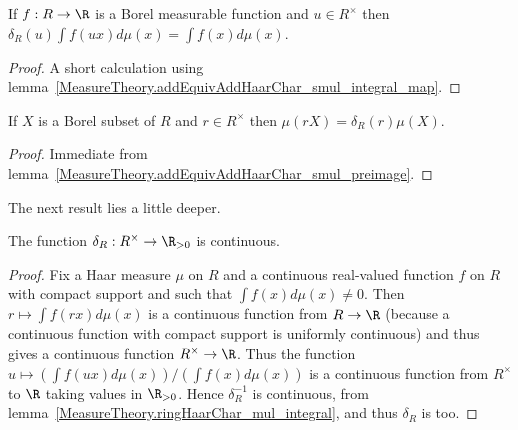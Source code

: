 \begin{lemma}
  \label{MeasureTheory.ringHaarChar_mul_integral}
  \leanok
  If $f:R\to\R$ is a Borel measurable function and $u\in R^\times$ then
  $\delta_R(u)\int f(ux)d\mu(x)=\int f(x)d\mu(x)$.
\end{lemma}
\begin{proof}
  \leanok
  A short calculation using lemma~\ref{MeasureTheory.addEquivAddHaarChar_smul_integral_map}.
\end{proof}

\begin{lemma}
  \label{MeasureTheory.ringHaarChar_mul_volume}
  \leanok
  If $X$ is a Borel subset of $R$ and $r\in R^\times$ then $\mu(rX)=\delta_R(r)\mu(X)$.
\end{lemma}
\begin{proof}
  \leanok
   Immediate from lemma~\ref{MeasureTheory.addEquivAddHaarChar_smul_preimage}.
\end{proof}

The next result lies a little deeper.

\begin{corollary}
  \label{MeasureTheory.ringHaarChar_continuous}
  \leanok
  The function $\delta_R:R^\times\to\R_{>0}$ is continuous.
\end{corollary}
\begin{proof}
  Fix a Haar measure $\mu$ on $R$ and a continuous real-valued function
  $f$ on $R$ with compact support and such that $\int f(x) d\mu(x)\not=0$.
  Then $r \mapsto \int f(rx) d\mu(x)$ is a continuous function
  from $R\to\R$ (because a continuous function with compact support is uniformly
   continuous) and thus gives a continuous function $R^\times\to\R$.
   Thus the function $u\mapsto (\int f(ux) d\mu(x))/(\int f(x)d\mu(x))$ is
   a continuous function from $R^\times$ to $\R$ taking values in $\R_{>0}$.
   Hence $\delta_R^{-1}$ is continuous,
   from lemma~\ref{MeasureTheory.ringHaarChar_mul_integral},
   and thus $\delta_R$ is too.
\end{proof}

